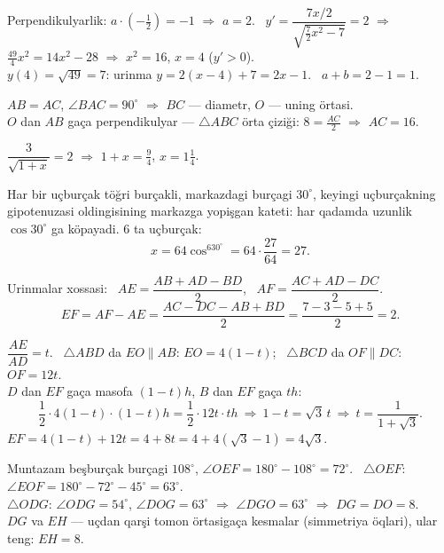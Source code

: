 Perpendikulyarlik: $a\cdot\left(-\frac12\right)=-1$ $\Rightarrow$ $a=2$. \ $y'=\dfrac{7x/2}{\sqrt{\frac72x^2-7}}=2$ $\Rightarrow$ $\frac{49}4x^2=14x^2-28$ $\Rightarrow$ $x^2=16$, $x=4$ ($y'>0$).\\
$y(4)=\sqrt{49}=7$: urinma $y=2(x-4)+7=2x-1$. \ $a+b=2-1=1$.

$AB=AC$, $\angle BAC=90^\circ$ $\Rightarrow$ $BC$ — diametr, $O$ — uning örtasi.\\
$O$ dan $AB$ gaça perpendikulyar — $\triangle ABC$ örta çiziği: $8=\frac{AC}2$ $\Rightarrow$ $AC=16$.

$\dfrac3{\sqrt{1+x}}=2$ $\Rightarrow$ $1+x=\frac94$, $x=1\frac14$.

Har bir uçburçak töğri burçakli, markazdagi burçagi $30^\circ$, keyingi uçburçakning gipotenuzasi oldingisining markazga yopişgan kateti: har qadamda uzunlik $\cos30^\circ$ ga köpayadi. $6$ ta uçburçak:
\[x=64\cos^630^\circ=64\cdot\frac{27}{64}=27.\]

Urinmalar xossasi: \ $AE=\dfrac{AB+AD-BD}2$, \ $AF=\dfrac{AC+AD-DC}2$.
\[EF=AF-AE=\frac{AC-DC-AB+BD}2=\frac{7-3-5+5}2=2.\]

$\dfrac{AE}{AD}=t$. \ $\triangle ABD$ da $EO\parallel AB$: $EO=4(1-t)$; \ $\triangle BCD$ da $OF\parallel DC$: $OF=12t$.\\
$D$ dan $EF$ gaça masofa $(1-t)h$, $B$ dan $EF$ gaça $th$:
\[\frac12\cdot4(1-t)\cdot(1-t)h=\frac12\cdot12t\cdot th\ \Rightarrow\ 1-t=\sqrt3\,t\ \Rightarrow\ t=\frac1{1+\sqrt3}.\]
$EF=4(1-t)+12t=4+8t=4+4(\sqrt3-1)=4\sqrt3$.

Muntazam beşburçak burçagi $108^\circ$, $\angle OEF=180^\circ-108^\circ=72^\circ$. \ $\triangle OEF$: $\angle EOF=180^\circ-72^\circ-45^\circ=63^\circ$.\\
$\triangle ODG$: $\angle ODG=54^\circ$, $\angle DOG=63^\circ$ $\Rightarrow$ $\angle DGO=63^\circ$ $\Rightarrow$ $DG=DO=8$.\\
$DG$ va $EH$ — uçdan qarşi tomon örtasigaça kesmalar (simmetriya öqlari), ular teng: $EH=8$.

